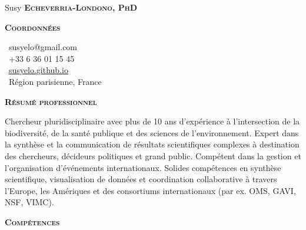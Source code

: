 \documentclass[10pt, a4paper]{article}
\newcommand{\headleft}[1]{\vspace*{3ex}\textsc{\textbf{#1}}\par%
    \vspace*{-1.5ex}\hrulefill\par\vspace*{0.7ex}}
\begin{document}
\setlength{\topskip}{0pt}
\setlength{\parindent}{0pt}
\setlength{\parskip}{0pt}
\setlength{\fboxsep}{0pt}
\pagestyle{empty}
\raggedbottom

\begin{minipage}[t]{0.33\textwidth} %
\colorbox{cvblue}{\begin{minipage}[t][5mm][t]{\textwidth}\null\hfill\null\end{minipage}}

\vspace{-.2ex} %
\colorbox{cvblue!90}{\color{white}  %
\textwidth\relax%
\begin{minipage}[t][293mm][t]{0.82\textwidth}
\raggedright
\vspace*{2.5ex}

\Large Susy \textbf{\textsc{Echeverria-Londono, PhD}} \normalsize 


\headleft{Coordonnées}
\small %
\MVAt\ {\small susyelo@gmail.com} \\[0.4ex]
\Mobilefone\ +33 6 36 01 15 45 \\[0.5ex]
\Mundus\ \href{https://susyelo.github.io/}{susyelo.github.io} \\[0.1ex]
\Letter\ Région parisienne, France
\normalsize

\vspace*{0.5ex} %

\headleft{Résumé professionnel}
\small Chercheur pluridisciplinaire avec plus de 10 ans d’expérience à l’intersection de la biodiversité, de la santé publique et des sciences de l’environnement. Expert dans la synthèse et la communication de résultats scientifiques complexes à destination des chercheurs, décideurs politiques et grand public. Compétent dans la gestion et l’organisation d’événements internationaux. Solides compétences en synthèse scientifique, visualisation de données et coordination collaborative à travers l’Europe, les Amériques et des consortiums internationaux (par ex. OMS, GAVI, NSF, VIMC).


\headleft{Compétences}
\normalsize

\begin{itemize}


\end{itemize}
\end{minipage}}
\end{minipage}
\end{document}

